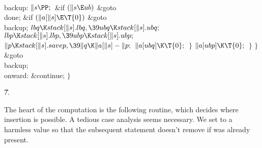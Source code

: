 \4\\{backup}:\5
${}\|s\PP;{}$\6
\&{if} ${}(\|s\E\\{ub}){}$\1\5
\&{goto} \\{done};\2\6
\&{if} ${}(\|a[\|s]\E\T{0}){}$\1\5
\&{goto} \\{backup};\2\6
${}\\{lbq}\K\\{stack}[\|s].\\{lbq},\39\\{ubq}\K\\{stack}[\|s].\\{ubq};{}$\6
${}\\{lbp}\K\\{stack}[\|s].\\{lbp},\39\\{ubp}\K\\{stack}[\|s].\\{ubp};{}$\6
${}\|p\K\\{stack}[\|s].\\{savep},\39\|q\K\|a[\|s]-\|p;{}$\6
${}\|a[\\{ubq}]\K\T{0};{}$\6
\4${}\}{}$\2\6
${}\|a[\\{ubp}]\K\T{0};{}$\6
\4${}\}{}$\2\6
\4${}\}{}$\2\6
\&{goto} \\{backup};\6
\4\\{onward}:\5
\&{continue};\6
\4${}\}{}$\2\2\par
\U7.\fi

The heart of the computation is the following routine, which decides
where insertion is possible. A tedious case analysis seems necessary.
We set  to a harmless value so that the subsequent statement
 doesn't remove  if  was already
present.

